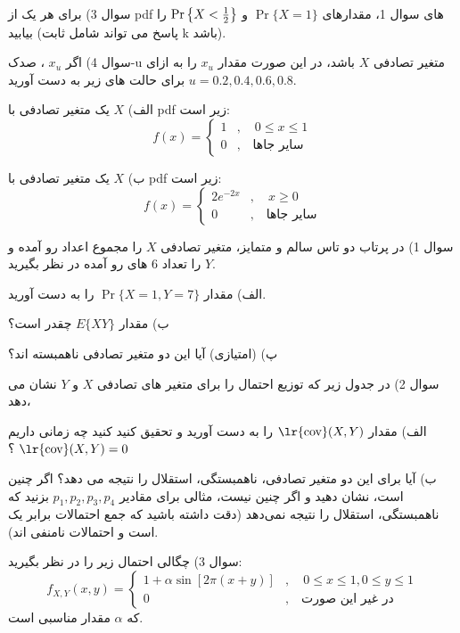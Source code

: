 \documentclass[10pt,letterpaper]{article}
\begin{document}
سوال 3) برای هر یک از pdf های سوال 1، مقدارهای 
$
\Pr\{X=1\}
$
و
$
\Pr\left\{X<{1\over 2}\right\}
$
را بیابید (پاسخ می تواند شامل ثابت k باشد).

سوال 4) اگر 
$
x_u
$
، صدک-u متغیر تصادفی 
$
X
$
باشد، در این صورت مقدار 
$
x_u
$
را به ازای 
$
u=0.2,0.4,0.6,0.8
$
برای حالت های زیر به دست آورید.

الف) 
$
X
$
یک متغیر تصادفی با pdf زیر است:
$$
f(x)=\begin{cases}
1&,\quad 0\le x\le 1\\
0&,\quad \text{سایر جاها}
\end{cases}
$$

ب) 
$
X
$
یک متغیر تصادفی با pdf زیر است:
$$
f(x)=\begin{cases}
2e^{-2x}&,\quad x\ge 0\\
0&,\quad \text{سایر جاها}
\end{cases}
$$

سوال 1) در پرتاب دو تاس سالم و متمایز، متغیر تصادفی $X$ را مجموع اعداد رو آمده و $Y$ را تعداد 6 های رو آمده در نظر بگیرید.

الف) مقدار 
$
\Pr\{X=1,Y=7\}
$
 را به دست آورید.

ب) مقدار 
$
E\{XY\}
$
 چقدر است؟

پ) (امتیازی) آیا این دو متغیر تصادفی ناهمبسته اند؟

سوال 2) در جدول زیر که توزیع احتمال را برای متغیر های تصادفی $X$ و $Y$ نشان می دهد،
\begin{table}[h]
\centering
\Large
{}
\end{table}

الف) مقدار 
$
\text{\lr{cov}}(X,Y)
$
 را به دست آورید و تحقیق کنید کنید چه زمانی داریم 
$
\text{\lr{cov}}(X,Y)=0
$
؟

ب) آیا برای این دو متغیر تصادفی، ناهمبستگی، استقلال را نتیجه می دهد؟ اگر چنین است، نشان دهید و اگر چنین نیست، مثالی برای مقادیر 
$
p_1,p_2,p_3,p_4
$
 بزنید که ناهمبستگی، استقلال را نتیجه نمی‌دهد (دقت داشته باشید که جمع احتمالات برابر یک است و احتمالات نامنفی اند).

سوال 3) چگالی احتمال زیر را در نظر بگیرید:
$$
f_{X,Y}(x,y)=\begin{cases}
1+\alpha\sin[2\pi(x+y)]&,\quad 0\le x\le1,0\le y\le1
\\0&,\quad \text{در غیر این صورت}
\end{cases}
$$
که $\alpha$ مقدار مناسبی است.
\end{document}
